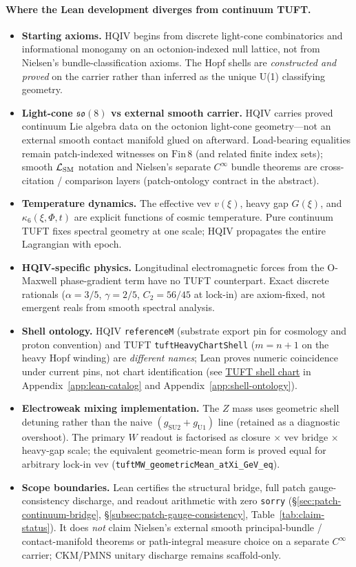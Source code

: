 \documentclass[11pt]{amsart}
\begin{document}
\paragraph{Where the Lean development diverges from continuum TUFT.}
\begin{itemize}[nosep]
\item \textbf{Starting axioms.} HQIV begins from discrete light-cone combinatorics and informational monogamy on an octonion-indexed null lattice, not from Nielsen's bundle-classification axioms. The Hopf shells are \emph{constructed and proved} on the carrier rather than inferred as the unique U(1) classifying geometry.
\item \textbf{Light-cone $\mathfrak{so}(8)$ vs external smooth carrier.} HQIV carries proved continuum Lie algebra data on the octonion light-cone geometry---not an external smooth contact manifold glued on afterward. Load-bearing equalities remain patch-indexed witnesses on $\mathrm{Fin}\,8$ (and related finite index sets); smooth $\mathcal{L}_{\rm SM}$ notation and Nielsen's separate $C^\infty$ bundle theorems are cross-citation / comparison layers (patch-ontology contract in the abstract).
\item \textbf{Temperature dynamics.} The effective vev $v(\xi)$, heavy gap $G(\xi)$, and $\kappa_6(\xi,\Phi,t)$ are explicit functions of cosmic temperature. Pure continuum TUFT fixes spectral geometry at one scale; HQIV propagates the entire Lagrangian with epoch.
\item \textbf{HQIV-specific physics.} Longitudinal electromagnetic forces from the O-Maxwell phase-gradient term have no TUFT counterpart. Exact discrete rationals ($\alpha=3/5$, $\gamma=2/5$, $C_2=56/45$ at lock-in) are axiom-fixed, not emergent reals from smooth spectral analysis.
\item \textbf{Shell ontology.} HQIV \texttt{referenceM} (substrate export pin for cosmology and proton convention) and TUFT \texttt{tuftHeavyChartShell} ($m=n+1$ on the heavy Hopf winding) are \emph{different names}; Lean proves numeric coincidence under current pins, not chart identification (see \hyperref[lean:shell-chart]{TUFT shell chart} in Appendix~\ref{app:lean-catalog} and Appendix~\ref{app:shell-ontology}).
\item \textbf{Electroweak mixing implementation.} The $Z$ mass uses geometric shell detuning rather than the naive $(g_{\mathrm{SU2}}+g_{\mathrm{U1}})$ line (retained as a diagnostic overshoot). The primary $W$ readout is factorised as closure $\times$ vev bridge $\times$ heavy-gap scale; the equivalent geometric-mean form is proved equal for arbitrary lock-in vev (\texttt{tuftMW\_geometricMean\_atXi\_GeV\_eq}).
\item \textbf{Scope boundaries.} Lean certifies the structural bridge, full patch gauge-consistency discharge, and readout arithmetic with zero \texttt{sorry} (§\ref{sec:patch-continuum-bridge}, \S\ref{subsec:patch-gauge-consistency}, Table~\ref{tab:claim-status}). It does \emph{not} claim Nielsen's external smooth principal-bundle / contact-manifold theorems or path-integral measure choice on a separate $C^\infty$ carrier; CKM/PMNS unitary discharge remains scaffold-only.
\end{itemize}
\end{document}

